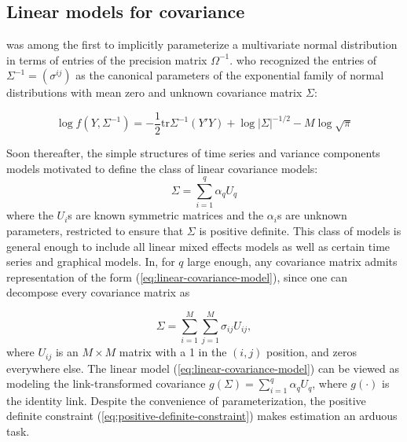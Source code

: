 \bigskip

\subsection{Linear models for covariance}
\cite{gabriel1962ante} was among the first to implicitly parameterize a multivariate normal distribution in terms of entries of the precision matrix $\Omega^{-1}$.  \cite{dempster1972covariance} who recognized the entries of $\Sigma^{-1} = \left(\sigma^{ij} \right)$ as the canonical parameters of the exponential family of normal distributions with mean zero and unknown covariance matrix $\Sigma$:

\[
\log f\left(Y, \Sigma^{-1}\right) = -\frac{1}{2}\mbox{tr}\Sigma^{-1} \left(Y'Y\right) + \log\vert \Sigma \vert^{-1/2} - M \log\sqrt{\pi}
\]

Soon thereafter, the simple structures of time series and variance components models motivated \cite{anderson1973asymptotically} to define the class of linear covariance models:
\begin{equation}\label{eq:linear-covariance-model}
\Sigma = \sum_{i = 1}^q \alpha_qU_q
\end{equation}
\noindent
where the $U_i$s are known symmetric matrices and the $\alpha_i$s are unknown parameters, restricted to ensure that $\Sigma$ is positive definite. This class of models is general enough to include all linear mixed effects models as well as certain time series and graphical models. In, for $q$ large enough, any covariance matrix admits representation of the form (\ref{eq:linear-covariance-model}), since one can decompose every covariance matrix as 

\begin{equation} \label{eq:linear-covariance-model-2}	
\Sigma = \sum_{i = 1}^M \sum_{j = 1}^M \sigma_{ij} U_{ij},
\end{equation}
\noindent
where $U_{ij}$ is an $M \times M$ matrix with a 1 in the $\left(i,j\right)$ position, and zeros everywhere else. The linear model (\ref{eq:linear-covariance-model}) can be viewed as modeling the link-transformed covariance $g\left(\Sigma\right) =\sum_{i = 1}^q \alpha_qU_q$, where $g\left(\cdot\right)$ is the identity link. Despite the convenience of parameterization, the positive definite constraint (\ref{eq:positive-definite-constraint}) makes estimation an arduous task. 

